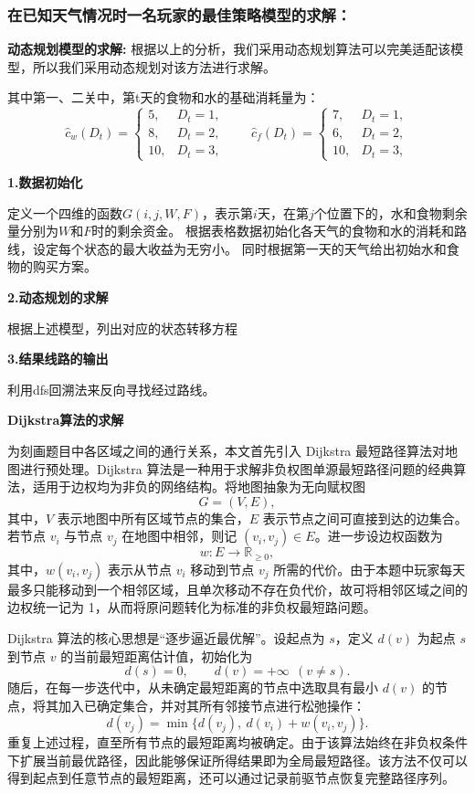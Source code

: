 \subsubsection{在已知天气情况时一名玩家的最佳策略模型的求解：}

 \textbf{动态规划模型的求解:}
根据以上的分析，我们采用动态规划算法可以完美适配该模型，所以我们采用动态规划对该方法进行求解。

其中第一、二关中，第t天的食物和水的基础消耗量为：
\[
\hat c_w(D_t)=
\begin{cases}
5, & D_t=1,\\
8, & D_t=2,\\
10, & D_t=3,
\end{cases}
\qquad
\hat c_f(D_t)=
\begin{cases}
7, & D_t=1,\\
6, & D_t=2,\\
10, & D_t=3,
\end{cases}
\]



\textbf{1.数据初始化}

定义一个四维的函数$G(i,j,W,F)$，表示第$i$天，在第$j$个位置下的，水和食物剩余量分别为$W$和$F$时的剩余资金。
%
根据表格数据初始化各天气的食物和水的消耗和路线，设定每个状态的最大收益为无穷小。
%
同时根据第一天的天气给出初始水和食物的购买方案。

\textbf{2.动态规划的求解}

根据上述模型，列出对应的状态转移方程

\textbf{3.结果线路的输出}

利用dfs回溯法来反向寻找经过路线。

 \textbf{Dijkstra算法的求解}

为刻画题目中各区域之间的通行关系，本文首先引入 Dijkstra 最短路径算法对地图进行预处理。Dijkstra 算法是一种用于求解非负权图单源最短路径问题的经典算法，适用于边权均为非负的网络结构。将地图抽象为无向赋权图
\[
G=(V,E),
\]
其中，\(V\) 表示地图中所有区域节点的集合，\(E\) 表示节点之间可直接到达的边集合。若节点 \(v_i\) 与节点 \(v_j\) 在地图中相邻，则记 \((v_i,v_j)\in E\)。进一步设边权函数为
\[
w:E\to \mathbb{R}_{\ge 0},
\]
其中，\(w(v_i,v_j)\) 表示从节点 \(v_i\) 移动到节点 \(v_j\) 所需的代价。由于本题中玩家每天最多只能移动到一个相邻区域，且单次移动不存在负代价，故可将相邻区域之间的边权统一记为 1，从而将原问题转化为标准的非负权最短路问题。

Dijkstra 算法的核心思想是“逐步逼近最优解”。设起点为 \(s\)，定义 \(d(v)\) 为起点 \(s\) 到节点 \(v\) 的当前最短距离估计值，初始化为
\[
d(s)=0,\qquad d(v)=+\infty \ \ (v\neq s).
\]
随后，在每一步迭代中，从未确定最短距离的节点中选取具有最小 \(d(v)\) 的节点，将其加入已确定集合，并对其所有邻接节点进行松弛操作：
\[
d(v_j)=\min\{d(v_j),\ d(v_i)+w(v_i,v_j)\}.
\]
重复上述过程，直至所有节点的最短距离均被确定。由于该算法始终在非负权条件下扩展当前最优路径，因此能够保证所得结果即为全局最短路径。该方法不仅可以得到起点到任意节点的最短距离，还可以通过记录前驱节点恢复完整路径序列。

